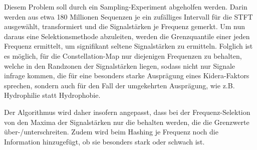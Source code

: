         Diesem Problem soll durch ein Sampling-Experiment abgeholfen werden. Darin werden aus etwa 180 Millionen Sequenzen je ein zufälliges Intervall für die STFT ausgewählt, transformiert und die Signalstärken je Frequenz gemerkt. Um nun daraus eine Selektionsmethode abzuleiten, werden die Grenzquantile einer jeden Frequenz ermittelt, um signifikant seltene Signalstärken zu ermitteln. Folglich ist es möglich, für die Constellation-Map nur diejenigen Frequenzen zu behalten, welche in den Randzonen der Signalstärken liegen, sodass nicht nur Signale infrage kommen, die für eine besonders starke Ausprägung eines Kidera-Faktors sprechen, sondern auch für den Fall der umgekehrten Ausprägung, wie z.B. Hydrophilie statt Hydrophobie.

        Der Algorithmus wird daher insofern angepasst, dass bei der Frequenz-Selektion von den Maxima der Signalstärken nur die behalten werden, die die Grenzwerte über-/unterschreiten. Zudem wird beim Hashing je Frequenz noch die Information hinzugefügt, ob sie besonders stark oder schwach ist.
    
